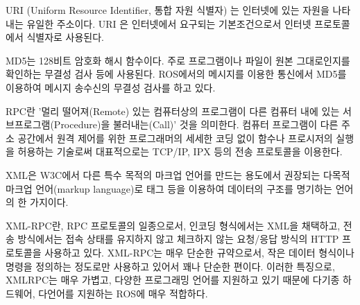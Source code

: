 \vspace{\baselineskip}
\begin{definition}\label{def:RosURI}
URI (Uniform Resource Identifier, 통합 자원 식별자) 는 인터넷에 있는 자원을 나타내는 유일한 주소이다. URI 은 인터넷에서 요구되는 기본조건으로서 인터넷 프로토콜에서 식별자로 사용된다.
\end{definition}

\vspace{\baselineskip}
\begin{definition}\label{def:RosMD5}
MD5는 128비트 암호화 해시 함수이다. 주로 프로그램이나 파일이 원본 그대로인지를 확인하는 무결성 검사 등에 사용된다. ROS에서의 메시지를 이용한 통신에서 MD5를 이용하여 메시지 송수신의 무결성 검사를 하고 있다.
\end{definition}

\vspace{\baselineskip}
\begin{definition}\label{def:RosRPC}
RPC란 '멀리 떨어져(Remote) 있는 컴퓨터상의 프로그램이 다른 컴퓨터 내에 있는 서브프로그램(Procedure)을 불러내는(Call)' 것을 의미한다. 컴퓨터 프로그램이 다른 주소 공간에서 원격 제어를 위한 프로그래머의 세세한 코딩 없이 함수나 프로시저의 실행을 허용하는 기술로써 대표적으로는 TCP/IP, IPX 등의 전송 프로토콜을 이용한다. 
\end{definition}

\vspace{\baselineskip}
\begin{definition}\label{def:RosXML}
XML은 W3C에서 다른 특수 목적의 마크업 언어를 만드는 용도에서 권장되는 다목적 마크업 언어(markup language)로 태그 등을 이용하여 데이터의 구조를 명기하는 언어의 한 가지이다. 
\end{definition}

\vspace{\baselineskip}
\begin{definition}[XMLRPC]\label{def:RosXMLRPC}
XML-RPC란, RPC 프로토콜의 일종으로서, 인코딩 형식에서는 XML을 채택하고, 전송 방식에서는 접속 상태를 유지하지 않고 체크하지 않는 요청/응답 방식의 HTTP 프로토콜을 사용하고 있다. XML-RPC는 매우 단순한 규약으로서, 작은 데이터 형식이나 명령을 정의하는 정도로만 사용하고 있어서 꽤나 단순한 편이다. 이러한 특징으로, XMLRPC는 매우 가볍고, 다양한 프로그래밍 언어를 지원하고 있기 때문에 다기종 하드웨어, 다언어를 지원하는 ROS에 매우 적합하다.
\end{definition}

